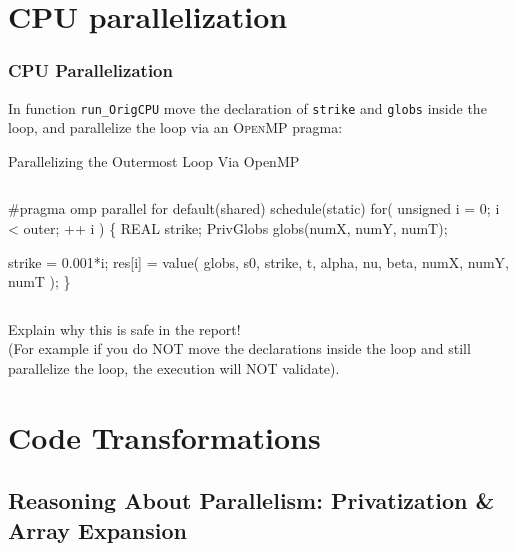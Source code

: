 \documentclass{beamer}
\newcommand{\emphh}[1]{\textcolor{CosGreen}{ #1}}
\begin{document}
\section{CPU parallelization}

\begin{frame}[fragile]
	\tableofcontents[currentsection]
\end{frame}

\begin{frame}[fragile,t]
  \frametitle{CPU Parallelization} %

In function {\tt run\_OrigCPU} move the declaration of
{\tt strike} and {\tt globs} inside the loop, and parallelize
the loop via an \textsc{OpenMP} pragma:

\begin{block}{Parallelizing the Outermost Loop Via OpenMP}
\begin{columns}
\begin{colorcode}
\emphh{\#pragma omp parallel for default(shared) schedule(static)}
    for( unsigned i = 0; i < outer; ++ i ) \{
        REAL strike;
        PrivGlobs    globs(numX, numY, numT);

        strike = 0.001*i;
        res[i] = value( globs, s0, strike, t,
                        alpha, nu,    beta,
                        numX,  numY,  numT );
    \}
\end{colorcode}
\end{columns}
\end{block} 

\alert{Explain why this is safe in the report!}\\
(For example if you do NOT move the declarations inside
the loop and still parallelize the loop, the execution
will NOT validate).

\end{frame}


\section{Code Transformations}

\begin{frame}[fragile]
	\tableofcontents[currentsection]
\end{frame}

\subsection{Reasoning About Parallelism: Privatization \& Array Expansion}
\end{document}
